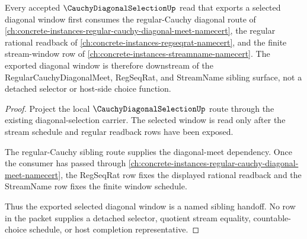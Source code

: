 \begin{theorem}
\label{thm:cauchy-diagonal-selection-regular-cauchy-dependency}
Every accepted $\CauchyDiagonalSelectionUp$ read that exports a selected diagonal window first consumes the regular-Cauchy diagonal route of \autoref{ch:concrete-instances-regular-cauchy-diagonal-meet-namecert}, the regular rational readback of \autoref{ch:concrete-instances-regseqrat-namecert}, and the finite stream-window row of \autoref{ch:concrete-instances-streamname-namecert}. The exported diagonal window is therefore downstream of the RegularCauchyDiagonalMeet, RegSeqRat, and StreamName sibling surface, not a detached selector or host-side choice function.
\end{theorem}
\begin{proof}
Project the local $\CauchyDiagonalSelectionUp$ route through the existing diagonal-selection carrier. The selected window is read only after the stream schedule and regular readback rows have been exposed.

The regular-Cauchy sibling route supplies the diagonal-meet dependency. Once the consumer has passed through \autoref{ch:concrete-instances-regular-cauchy-diagonal-meet-namecert}, the RegSeqRat row fixes the displayed rational readback and the StreamName row fixes the finite window schedule.

Thus the exported selected diagonal window is a named sibling handoff. No row in the packet supplies a detached selector, quotient stream equality, countable-choice schedule, or host completion representative.
\end{proof}
